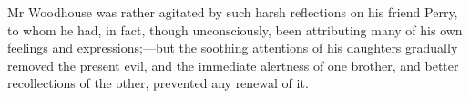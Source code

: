 Mr Woodhouse was rather agitated by such harsh reflections on his friend Perry, to whom he had, in fact, though unconsciously, been attributing many of his own feelings and expressions;—but the soothing attentions of his daughters gradually removed the present evil, and the immediate alertness of one brother, and better recollections of the other, prevented any renewal of it.